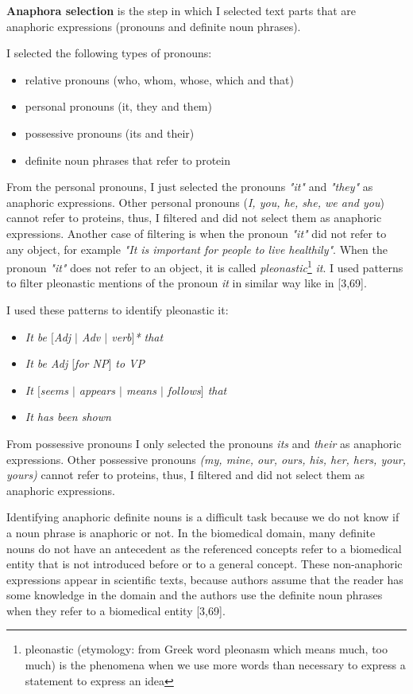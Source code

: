 \textbf{Anaphora selection} is the step in which I selected text parts that are anaphoric expressions (pronouns and definite noun phrases).
 
I selected the following types of pronouns:

\begin{itemize}
	\item relative pronouns (who, whom, whose, which and that)
	\item personal pronouns (it, they and them)
	\item possessive pronouns (its and their)
	\item definite noun phrases that refer to protein 
\end{itemize}

From the personal pronouns, I just selected the pronouns \emph{"it"} and \emph{"they"} as anaphoric expressions. Other personal pronouns (\emph{I, you, he, she, we and you}) cannot refer to proteins, thus, I filtered and did not select them as anaphoric expressions. Another case of filtering is when the pronoun \emph{"it"} did not refer to any object, for example \emph{"It is important for people to live healthily"}. When the pronoun \emph{"it"} does not refer to an object, it is called \emph{pleonastic}\footnote{ pleonastic (etymology: from Greek word pleonasm which means much, too much) is the phenomena when we use more words than necessary to express a statement to express an idea} \emph{it}. I used patterns to filter pleonastic mentions of the pronoun \emph{it} in similar way like in [3,69]. 

I used these patterns to identify pleonastic it:

\begin{itemize}
	\item \emph{It be $[$Adj $|$ Adv $|$ verb$]$* that}
	\item \emph{It be Adj $[$for NP$]$ to VP}
	\item \emph{It $[$seems $|$ appears $|$ means $|$ follows$]$ that} 
	\item \emph{It has been shown}
\end{itemize}

From possessive pronouns I only selected the pronouns \emph{its} and \emph{their} as anaphoric expressions. Other possessive pronouns \emph{(my, mine, our, ours, his, her, hers, your, yours)} cannot refer to proteins, thus, I filtered and did not select them as anaphoric expressions.

Identifying anaphoric definite nouns is a difficult task because we do not know if a noun phrase is anaphoric or not. In the biomedical domain, many definite nouns do not have an antecedent as the referenced concepts refer to a biomedical entity that is not introduced before or to a general concept. These non-anaphoric expressions appear in scientific texts, because authors assume that the reader has some knowledge in the domain and the authors use the definite noun phrases when they refer to a biomedical entity [3,69]. 

